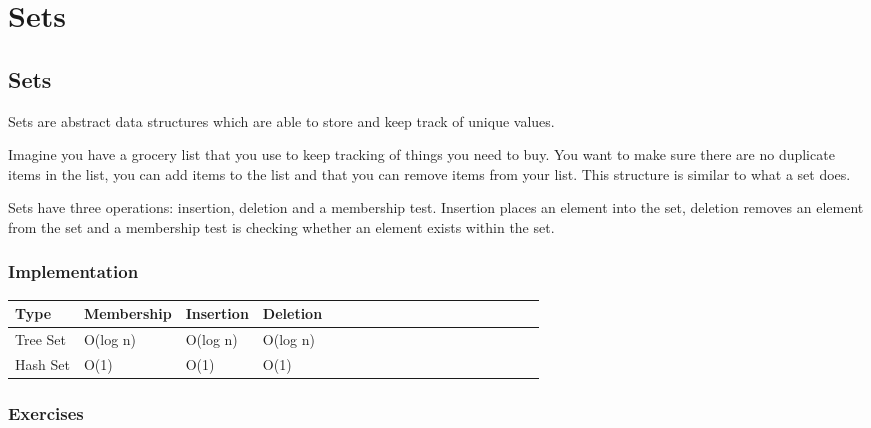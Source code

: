\documentclass[11pt,oneside]{book}
\begin{document}
    \chapter{ Sets }
        \section{ Sets }
        

Sets are abstract data structures which are able to store and keep track of unique values.

Imagine you have a grocery list that you use to keep tracking of things you need to buy. You want to make sure there are no duplicate items in the list, you can add items to the list and that you can remove items from your list. This structure is similar to what a set does.

Sets have three operations: insertion, deletion and a membership test. Insertion places an element into the set, deletion removes an element from the set and a membership test is checking whether an element exists within the set.

\subsection{Implementation}

\vspace{10px}\begin{tabulary}{0.4\linewidth}{|l|l|l|l|l|l|l|l|l|l|l|l|l|l|l|l|l|l|l}\hline


  Type &
  Membership &
  Insertion &
  Deletion\\
\hline


  Tree Set &
  O(log n) &
  O(log n) &
  O(log n)\\

  Hash Set &
  O(1) &
  O(1) &
  O(1)\\

\hline\end{tabulary}

\subsection{Exercises}
\end{document}
